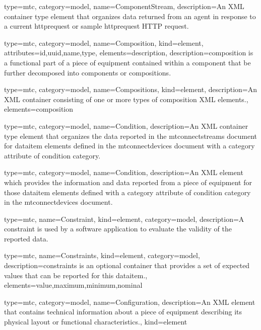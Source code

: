 {
  type=mtc,
  category=model,
  name={ComponentStream},
  description={An XML container type element that organizes data returned from an \gls{agent} in response to a \gls{current httprequest} or \gls{sample httprequest} HTTP request.} 
}


{
  type=mtc,
  category=model,
  name={Composition},
  kind={element},
  attributes={\gls{id},\gls{uuid},\gls{name},\gls{type}},
  elements={\gls{description}},
  description={\gls{composition} is a functional part of a piece of equipment contained within a \gls{component} that \MUSTNOT be further decomposed into \gls{component}s or \gls{composition}s.}
}


{
  type=mtc,
  category=model,
  name={Compositions},
  kind={element},
  description={An XML container consisting of one or more types of \gls{composition} XML elements.},
  elements={\gls{composition}}
}


{
  type=mtc,
  category=model,
  name={Condition},
  description={An XML container type element that organizes the data reported in the \gls{mtconnectstreams} document for \gls{dataitem} elements defined in the \gls{mtconnectdevices} document with a \gls{category} attribute of \gls{condition category}.}
}

{
  type=mtc,
  category=model,
  name={Condition},
  description={An XML element which provides the information and data reported from a piece of equipment for those \gls{dataitem} elements defined with a \gls{category} attribute of \gls{condition category} in the \gls{mtconnectdevices} document.}
}


{
  type=mtc,
  name={Constraint},
  kind={element},
  category=model,
  description={A \gls{constraint} is used by a software application to evaluate the validity of the reported data.}
}

{
  type=mtc,
  name={Constraints},
  kind={element},
  category=model,
  description={\gls{constraints} is an optional container that provides a set of expected values that can be reported for this \gls{dataitem}.},
  elements={\gls{value},\gls{maximum},\gls{minimum},\gls{nominal}}
}


{
  type=mtc,
  category=model,
  name={Configuration},
  description={An XML element that contains technical information about a piece of equipment describing its physical layout or functional characteristics.},
  kind={element}
}



